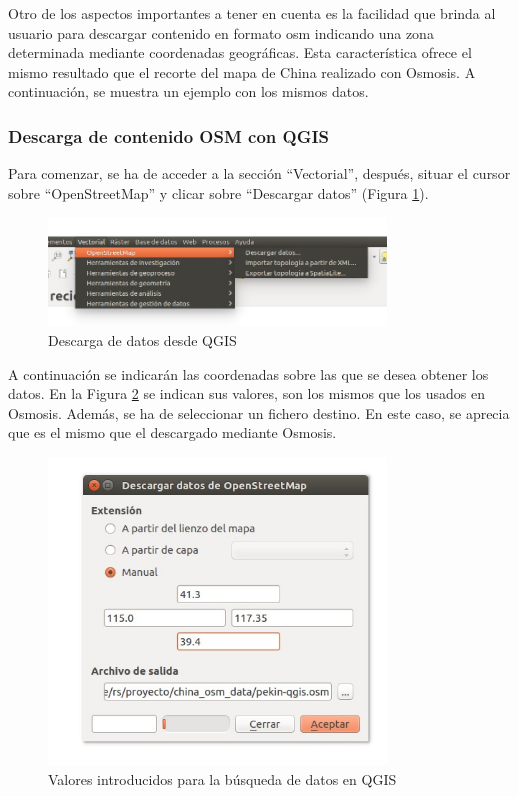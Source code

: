Otro de los aspectos importantes a tener en cuenta es la facilidad que brinda al usuario para descargar contenido en formato osm indicando una zona determinada mediante coordenadas geográficas. Esta característica ofrece el mismo resultado que el recorte del mapa de China realizado con Osmosis. A continuación, se muestra un ejemplo con los mismos datos.

\subsubsection{Descarga de contenido OSM con QGIS}
Para comenzar, se ha de acceder a la sección ``Vectorial'', después, situar el cursor sobre ``OpenStreetMap'' y clicar sobre ``Descargar datos'' (Figura \ref{vectorial}).

\begin{figure}[h]
  \centering
    \includegraphics[width=0.8\textwidth]{../img/qgis/descarga.jpg}
  \caption{Descarga de datos desde QGIS}
  \label{vectorial}
\end{figure}

A continuación se indicarán las coordenadas sobre las que se desea obtener los datos. En la Figura \ref{datos} se indican sus valores, son los mismos que los usados en Osmosis. Además, se ha de seleccionar un fichero destino. En este caso, se aprecia que es el mismo que el descargado mediante Osmosis.

\begin{figure}[h]
  \centering
    \includegraphics[width=0.8\textwidth]{../img/qgis/pekin-qgis.jpg}
  \caption{Valores introducidos para la búsqueda de datos en QGIS}
  \label{datos}
\end{figure}

